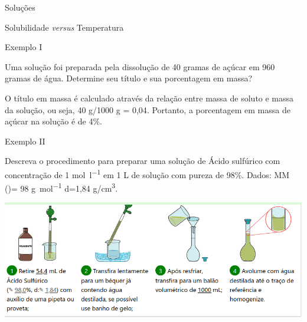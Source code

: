 \documentclass[presentation,professionalfonts,aspectratio=169]{beamer}
\begin{document}
\begin{frame}[label={sec:orgbd3cab3}]{Soluções}
\begin{description}
\begin{frame}[label={sec:org3015545}]{Solubilidade \emph{versus} Temperatura}
\begin{frame}[label={sec:org7a8d27d}]{Exemplo I}
\begin{question}
Uma solução foi preparada pela dissolução de 40 gramas de açúcar em 960 gramas de água. Determine seu título e sua porcentagem em massa?
\end{question}

\begin{answer}[print=true]
O título em massa é calculado através da relação entre massa de soluto e massa da solução, ou seja, 40 g/1000 g = \alert{0,04}. Portanto, a porcentagem em massa de açúcar na solução é de \alert{4\%}.
\end{answer}
\end{frame}


\begin{frame}[label={sec:org9858bd1}]{Exemplo II}
\begin{question}
Descreva o procedimento para preparar uma solução de Ácido sulfúrico com concentração de 1 \unit{\mol\per\litre} em 1 L de solução com pureza de 98\%. Dados: MM ()= 98 \unit{\gram\per\mol} d=1,84 g/cm\textsuperscript{3}.

\begin{center}
\includegraphics[scale=.3]{FQ/Solucoes/acid.png}
\end{center}
\end{question}
\end{frame}


\end{frame}
\end{description}
\end{frame}
\end{document}
